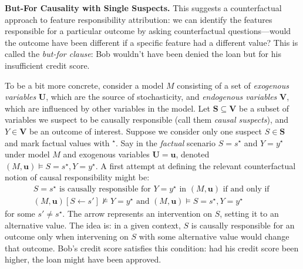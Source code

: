 \documentclass[anon,12pt]{clear2025} %
\begin{document}

\vspace{2mm}
\noindent \textbf{But-For Causality with Single Suspects.} This suggests a counterfactual approach to feature responsibility attribution: we can identify the features responsible for a particular outcome by asking counterfactual questions—would the outcome have been different if a specific feature had a different value? This is called the \textit{but-for clause}: Bob wouldn’t have been denied the loan but for his insufficient credit score.  

To be a bit more concrete, consider a model $M$ consisting of a set of \emph{exogenous variables} $\mathbf{U}$, which are the source of stochasticity,  and \emph{endogenous variables} $\mathbf{V}$, which are influenced by other variables in the model. Let $\mathbf{S} \subseteq \mathbf{V}$ be a subset of variables we suspect to be causally responsible (call them \emph{causal suspects}), and $Y \in  \mathbf{V}$ be an outcome of interest. Suppose we  consider only one suspect $S \in \mathbf{S}$ and mark factual values with $^\star$. Say in the \emph{factual} scenario  $S = s^\star$ and $Y = y^\star$ under model $M$ and exogenous variables $\mathbf{U} = \mathbf{u}$, denoted $(M, \mathbf{u}) \models S=s^\star, Y=y^\star$. A first attempt at defining the relevant counterfactual notion of causal responsibility might be:
\begin{align*}
S=s^\star \text{ is causally responsible for } Y=y^\star \text{ in } (M, \mathbf{u}) \text{ if and only if } \\   (M, \mathbf{u})[S \leftarrow s'] \not \models Y=y^\star \text{ and } (M, \mathbf{u}) \models S=s^\star, Y=y^\star
\end{align*}
for some $s' \neq s^\star$.
The arrow represents an intervention on $S$, setting it to an alternative value. The idea is: in a given context, $S$ is causally responsible for an outcome only when intervening on $S$ with some alternative value would change that outcome. Bob’s credit score satisfies this condition: had his credit score been higher, the loan might have been approved.  
\end{document}
